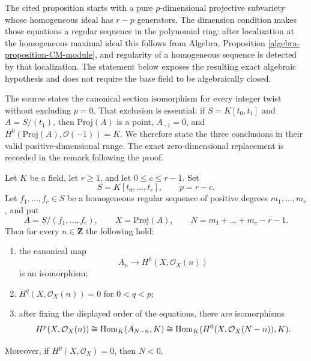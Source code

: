 \begin{lemma}
\label{lemma-projective-complete-intersection-cohomology}
\begin{reference}
\cite[Chapter III, \S 5, no. 78, Proposition 5 and remark,
pp. 273--274]{FAC}
\end{reference}
\begin{history}
The cited proposition starts with a pure $p$-dimensional projective
subvariety whose homogeneous ideal has $r-p$ generators. The dimension
condition makes those equations a regular sequence in the polynomial ring:
after localization at the homogeneous maximal ideal this follows from
Algebra, Proposition \ref{algebra-proposition-CM-module}, and regularity of
a homogeneous sequence is detected by that localization. The statement
below exposes the resulting exact algebraic hypothesis and does not require
the base field to be algebraically closed.

The source states the canonical section isomorphism for every integer twist
without excluding $p=0$. That exclusion is essential: if
$S=K[t_0,t_1]$ and $A=S/(t_1)$, then $\text{Proj}(A)$ is a point,
$A_{-1}=0$, and $H^0(\text{Proj}(A),\mathcal O(-1))=K$. We therefore state
the three conclusions in their valid positive-dimensional range. The exact
zero-dimensional replacement is recorded in the remark following the proof.
\end{history}
Let $K$ be a field, let $r\geq1$, and let $0\leq c\leq r-1$. Set
$$
S=K[t_0,\ldots,t_r],\qquad p=r-c.
$$
Let $f_1,\ldots,f_c\in S$ be a homogeneous regular sequence of positive
degrees $m_1,\ldots,m_c$, and put
$$
A=S/(f_1,\ldots,f_c),\qquad X=\text{Proj}(A),\qquad
N=m_1+\ldots+m_c-r-1.
$$
Then for every $n\in\mathbf Z$ the following hold:
\begin{enumerate}
\item the canonical map
$$
A_n\longrightarrow H^0(X,\mathcal O_X(n))
$$
is an isomorphism;
\item $H^q(X,\mathcal O_X(n))=0$ for $0<q<p$;
\item after fixing the displayed order of the equations, there are
isomorphisms
$$
H^p(X,\mathcal O_X(n))\cong
\mathop{\mathrm{Hom}}\nolimits_K(A_{N-n},K)\cong
\mathop{\mathrm{Hom}}\nolimits_K(H^0(X,\mathcal O_X(N-n)),K).
$$
\end{enumerate}
Moreover, if $H^p(X,\mathcal O_X)=0$, then $N<0$.
\end{lemma}


